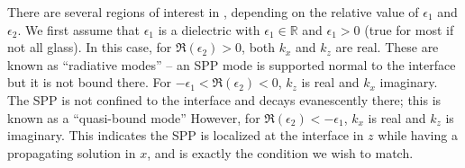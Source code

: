 There are several regions of interest in ,
depending on the relative value of $\epsilon_1$ and $\epsilon_2$.  We first
assume that $\epsilon_1$ is a dielectric with $\epsilon_1\in\mathbb{R}$ and
$\epsilon_1 > 0$ (true for most if not all glass).  In this case, for
$\Re(\epsilon_2)>0$, both $k_x$ and $k_z$ are real.  These are known as
``radiative modes'' -- an SPP mode is supported normal to the interface but
it is not bound there.  For $-\epsilon_1<\Re(\epsilon_2)<0$, $k_z$ is real
and $k_x$ imaginary.  The SPP is not confined to the interface and decays
evanescently there; this is known as a ``quasi-bound mode''  However, for
$\Re(\epsilon_2)<-\epsilon_1$, $k_x$ is real and $k_z$ is imaginary.  This
indicates the SPP is localized at the interface in $z$ while having a
propagating solution in $x$, and is exactly the condition we wish to match.
